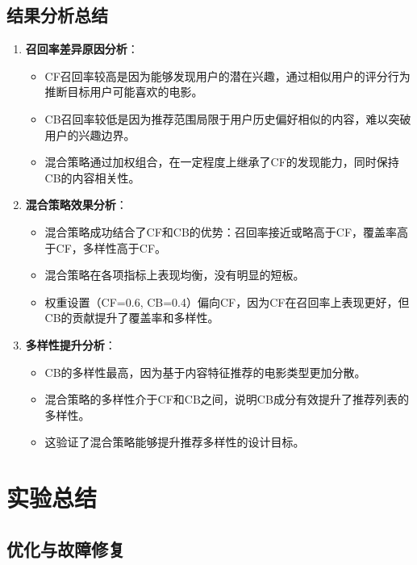 \documentclass[a4paper]{article}
\begin{document}
\subsection{结果分析总结}

\begin{enumerate}
    \item \textbf{召回率差异原因分析}：
    \begin{itemize}
        \item CF召回率较高是因为能够发现用户的潜在兴趣，通过相似用户的评分行为推断目标用户可能喜欢的电影。
        \item CB召回率较低是因为推荐范围局限于用户历史偏好相似的内容，难以突破用户的兴趣边界。
        \item 混合策略通过加权组合，在一定程度上继承了CF的发现能力，同时保持CB的内容相关性。
    \end{itemize}
    
    \item \textbf{混合策略效果分析}：
    \begin{itemize}
        \item 混合策略成功结合了CF和CB的优势：召回率接近或略高于CF，覆盖率高于CF，多样性高于CF。
        \item 混合策略在各项指标上表现均衡，没有明显的短板。
        \item 权重设置（CF=0.6, CB=0.4）偏向CF，因为CF在召回率上表现更好，但CB的贡献提升了覆盖率和多样性。
    \end{itemize}
    
    \item \textbf{多样性提升分析}：
    \begin{itemize}
        \item CB的多样性最高，因为基于内容特征推荐的电影类型更加分散。
        \item 混合策略的多样性介于CF和CB之间，说明CB成分有效提升了推荐列表的多样性。
        \item 这验证了混合策略能够提升推荐多样性的设计目标。
    \end{itemize}
\end{enumerate}

\section{实验总结}

\subsection{优化与故障修复}
\end{document}
